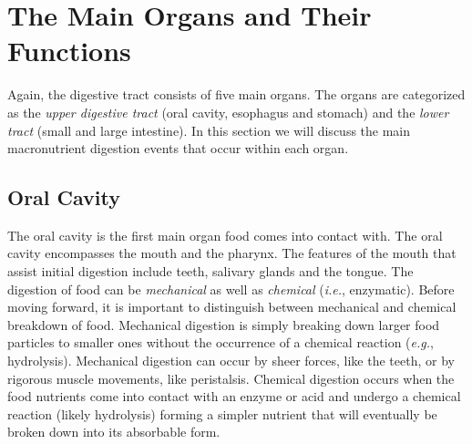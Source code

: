 \documentclass{tufte-handout}
\begin{document}
\section{The Main Organs and Their Functions}
Again, the digestive tract consists of five main organs. The organs are categorized as the  \emph{upper digestive tract} (oral cavity, esophagus and stomach) and the \emph{lower tract} (small and large intestine). In this section we will discuss the main macronutrient digestion events that occur within each
organ.

\subsection{Oral Cavity}
The oral cavity is the first main organ food comes into contact with. The oral cavity encompasses the mouth and the pharynx. The features of the mouth that assist initial digestion include teeth, salivary glands and the tongue. The digestion of food can be \emph{mechanical} as well as \emph{chemical} (\textit{i.e.}, enzymatic). Before moving forward, it is important to distinguish between mechanical and chemical breakdown of food. Mechanical digestion is simply breaking down larger food particles to smaller ones without the occurrence of a chemical reaction (\textit{e.g.}, hydrolysis). Mechanical digestion can occur by sheer forces, like the teeth, or by rigorous muscle movements, like peristalsis. Chemical digestion occurs when the food nutrients come into contact with an enzyme or acid and undergo a chemical reaction (likely hydrolysis) forming a simpler nutrient that will eventually be broken down into its absorbable form. 
\end{document}
